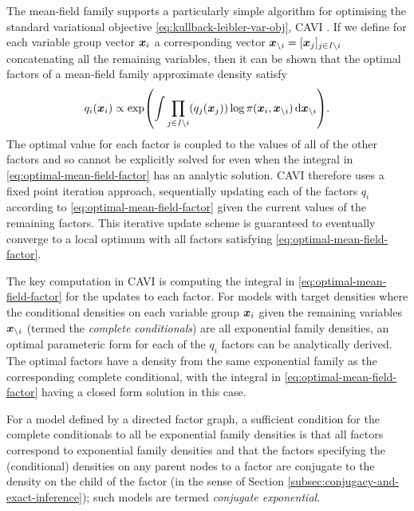 The mean-field family supports a particularly simple algorithm for optimising the standard variational objective \eqref{eq:kullback-leibler-var-obj}, \ac{CAVI} \citep{bishop2006pattern,blei2017variational}. If we define for each variable group vector $\boldsymbol{x}_i$ a corresponding vector $\boldsymbol{x}_{\setminus i} = [\boldsymbol{x}_j]_{j\in\mathit{I}\setminus i}$ concatenating all the remaining variables, then it can be shown that the optimal factors of a mean-field family approximate density satisfy
\begin{equation}\label{eq:optimal-mean-field-factor}
  q_i(\vct{x}_i) \propto \exp\lpa
    \int \prod_{j\in\set{I}\setminus i} \lpa q_j(\vct{x}_j) \rpa \log\pi(\vct{x}_i, \vct{x}_{\setminus i})
    \,\dr\vct{x}_{\setminus i}
  \rpa.
\end{equation}
The optimal value for each factor is coupled to the values of all of the other factors and so cannot be explicitly solved for even when the integral in \eqref{eq:optimal-mean-field-factor} has an analytic solution. \ac{CAVI} therefore uses a fixed point iteration approach, sequentially updating each of the factors $q_{i}$ according to \eqref{eq:optimal-mean-field-factor} given the current values of the remaining factors. This iterative update scheme is guaranteed to eventually converge to a local optimum with all factors satisfying \eqref{eq:optimal-mean-field-factor}.

The key computation in \ac{CAVI} is computing the integral in \eqref{eq:optimal-mean-field-factor} for the updates to each factor. For models with target densities where the conditional densities on each variable group $\boldsymbol{x}_i$ given the remaining variables $\boldsymbol{x}_{\setminus i}$ (termed the \emph{complete conditionals}) are all exponential family densities, an optimal parameteric form for each of the $q_{i}$ factors can be analytically derived. The optimal factors have a density from the same exponential family as the corresponding complete conditional, with the integral in \eqref{eq:optimal-mean-field-factor} having a closed form solution in this case. 

For a model defined by a directed factor graph, a sufficient condition for the complete conditionals to all be exponential family densities is that all factors correspond to exponential family densities and that the factors specifying the (conditional) densities on any parent nodes to a factor are conjugate to the density on the child of the factor (in the sense of Section \ref{subsec:conjugacy-and-exact-inference}); such models are termed \emph{conjugate exponential}. 

